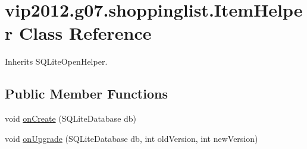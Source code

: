 \hypertarget{classvip2012_1_1g07_1_1shoppinglist_1_1ItemHelper}{\section{vip2012.\-g07.\-shoppinglist.\-Item\-Helper Class Reference}
\label{d9/d0d/classvip2012_1_1g07_1_1shoppinglist_1_1ItemHelper}
}


Inherits S\-Q\-Lite\-Open\-Helper.

\subsection*{Public Member Functions}
\begin{DoxyCompactItemize}
\item 
void \hyperlink{classvip2012_1_1g07_1_1shoppinglist_1_1ItemHelper_ab1ed292b65601af71a1a1eaa4845a38d}{on\-Create} (S\-Q\-Lite\-Database db)
\item 
void \hyperlink{classvip2012_1_1g07_1_1shoppinglist_1_1ItemHelper_aadfbfc9db707f0ec6a5a6d8deaa15a28}{on\-Upgrade} (S\-Q\-Lite\-Database db, int old\-Version, int new\-Version)
\end{DoxyCompactItemize}
